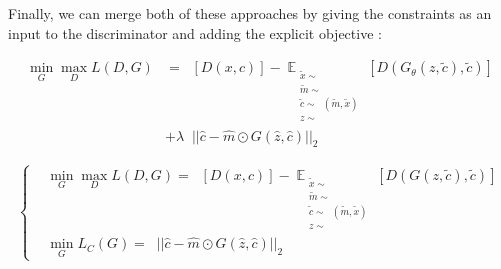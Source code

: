 \documentclass{article}
\begin{document}
	Finally, we can merge both of these approaches by giving the constraints as an input to the discriminator and adding the explicit objective :
	
	\begin{align}
	\min_G \max_D L(D, G)  &= \mathop{\mathbb{{E}}_{\substack{
				x \sim \mathop{\mathbb{{P}}_{r}} \\
				m \sim \mathop{\mathbb{{P}}_{m}} \\
				c \sim \mathop{\mathbb{{P}}_{c}}(m, x)
	}}} [D(x, c)] 
	- \mathop{\mathbb{{E}}}_{\substack{
			\tilde{x} \sim \mathop{\mathbb{{P}}_{r}} \\
			\tilde{m} \sim \mathop{\mathbb{{P}}_{m} }\\
			\tilde{c} \sim \mathop{\mathbb{{P}}_{c}}(\tilde{m}, \tilde{x})\\
			z \sim \mathop{\mathbb{{P}}_{z} }
	}} [D(G_\theta(z, \tilde{c}), \tilde{c})]   \nonumber \\
	& + \lambda \mathop{\mathbb{{E}}_{\substack{
				\hat{x} \sim \mathop{\mathbb{{P}}_{r}} \\
				\hat{z} \sim \mathop{\mathbb{{P}}_{z}}\\
				\hat{m} \sim \mathop{\mathbb{{P}}_{z}} \\	
				\hat{c} \sim \mathop{\mathbb{{P}}_{c}}(\hat{m}, \hat{x})
	}}} || \hat{c} - \hat{m} \odot G(\hat{z}, \hat{c}) ||_2
	\end{align}
	
	\begin{equation}
	\left\{  \begin{split}
	& \min_G \max_D L(D, G)  = \mathop{\mathbb{{E}}_{\substack{
				x \sim \mathop{\mathbb{{P}}_{r}} \\
				m \sim \mathop{\mathbb{{P}}_{m}}\\
				c \sim \mathop{\mathbb{{P}}_{c}}(m, x)
	}}} [D(x, c)] 
	- \mathop{\mathbb{{E}}}_{\substack{
			\tilde{x} \sim \mathop{\mathbb{{P}}_{r}} \\
			\tilde{m} \sim \mathop{\mathbb{{P}}_{m} }\\
			\tilde{c} \sim \mathop{\mathbb{{P}}_{c}}(\tilde{m}, \tilde{x})\\
			z \sim \mathop{\mathbb{{P}}_{z} }
	}} [D(G(z, \tilde{c}), \tilde{c})] \\
	& \min_G L_C(G) = \mathop{\mathbb{{E}}_{\substack{
				\hat{x} \sim \mathop{\mathbb{{P}}_{r}} \\
				\hat{z} \sim \mathop{\mathbb{{P}}_{z}}\\
				\hat{m} \sim \mathop{\mathbb{{P}}_{z}} \\	
				\hat{c} \sim \mathop{\mathbb{{P}}_{c}}(\hat{m}, \hat{x})
	}}} || \hat{c} - \hat{m} \odot G(\hat{z}, \hat{c}) ||_2
	\end{split}\right.
	\end{equation}		
\end{document}
